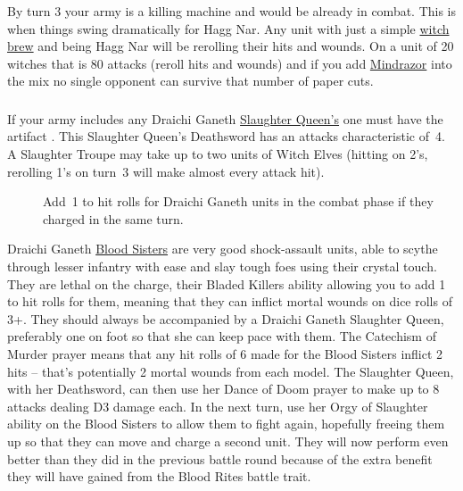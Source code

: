 By turn 3 your army is a killing machine and would be already in combat. This is
when things swing dramatically for Hagg Nar. Any unit with just a simple
\hyperref[witchbrew]{witch brew} and being Hagg Nar will be rerolling their
hits and wounds. On a unit of 20 witches that is 80 attacks (reroll hits and
wounds) and if you add \hyperref[mindrazor]{Mindrazor} into the mix no single opponent
can survive that number of paper cuts. 


\subsubsection{}
If your army includes any Draichi Ganeth \hyperref[slaughter-queen]{Slaughter
Queen's} one must have the artifact \textbf{}. This Slaughter Queen's Deathsword has an attacks characteristic
of~4. A Slaughter Troupe may take up to two units of Witch Elves (hitting on
2's, rerolling 1's on turn~3 will make almost every attack hit).\\
\begin{description}
    \item [] Add~1 to hit rolls for Draichi
    Ganeth units in the combat phase if they charged in the same turn.
\end{description}
Draichi Ganeth \hyperref[blood-sisters]{Blood Sisters} are very good
shock-assault units, able to scythe through lesser infantry with ease and slay
tough foes using their crystal touch. They are lethal on the charge, their
Bladed Killers ability allowing you to add 1 to hit rolls for them, meaning
that they can inflict mortal wounds on dice rolls of 3+. They should always be
accompanied by a Draichi Ganeth Slaughter Queen, preferably one on foot so that
she can keep pace with them.  The Catechism of Murder prayer means that any hit
rolls of 6 made for the Blood Sisters inflict 2 hits -- that’s potentially
2 mortal wounds from each model.  The Slaughter Queen, with her Deathsword, can
then use her Dance of Doom prayer to make up to 8 attacks dealing D3 damage
each. In the next turn, use her Orgy of Slaughter ability on the Blood Sisters
to allow them to fight again, hopefully freeing them up so that they can move
and charge a second unit. They will now perform even better than they did in
the previous battle round because of the extra benefit they will have gained
from the Blood Rites battle trait.

